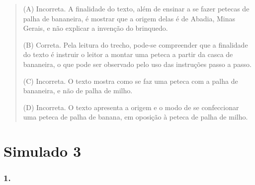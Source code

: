 \begin{quote}
(A) Incorreta. A finalidade do texto, além de ensinar a se fazer petecas
de palha de bananeira, é mostrar que a origem delas é de Abadia, Minas
Gerais, e não explicar a invenção do brinquedo.

(B) Correta. Pela leitura do trecho, pode-se compreender que a
finalidade do texto é instruir o leitor a montar uma peteca a partir da
casca de bananeira, o que pode ser observado pelo uso das instruções
passo a passo.

(C) Incorreta. O texto mostra como se faz uma peteca com a palha de
bananeira, e não de palha de milho.

(D) Incorreta. O texto apresenta a origem e o modo de se confeccionar
uma peteca de palha de banana, em oposição à peteca de palha de milho.
\end{quote}

\section{Simulado 3}\label{simulado-3}

\subsubsection{1. }\label{section-88}

